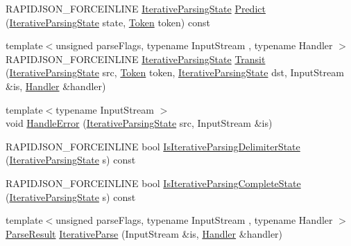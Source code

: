 \begin{DoxyCompactItemize}
\item 
R\+A\+P\+I\+D\+J\+S\+O\+N\+\_\+\+F\+O\+R\+C\+E\+I\+N\+L\+I\+NE \mbox{\hyperlink{classrapidjson_1_1_generic_reader_a1fd8fb2f2f017d42c89a5e11cd074e1e}{Iterative\+Parsing\+State}} \mbox{\hyperlink{classrapidjson_1_1_generic_reader_a83f1f41277978fa24483a53145b11bdd}{Predict}} (\mbox{\hyperlink{classrapidjson_1_1_generic_reader_a1fd8fb2f2f017d42c89a5e11cd074e1e}{Iterative\+Parsing\+State}} state, \mbox{\hyperlink{classrapidjson_1_1_generic_reader_a3fc870df419c60425cea2a15d36790d1}{Token}} token) const
\item 
{\footnotesize template$<$unsigned parse\+Flags, typename Input\+Stream , typename Handler $>$ }\\R\+A\+P\+I\+D\+J\+S\+O\+N\+\_\+\+F\+O\+R\+C\+E\+I\+N\+L\+I\+NE \mbox{\hyperlink{classrapidjson_1_1_generic_reader_a1fd8fb2f2f017d42c89a5e11cd074e1e}{Iterative\+Parsing\+State}} \mbox{\hyperlink{classrapidjson_1_1_generic_reader_af05af45f9228b7e306a02f8010eeaa46}{Transit}} (\mbox{\hyperlink{classrapidjson_1_1_generic_reader_a1fd8fb2f2f017d42c89a5e11cd074e1e}{Iterative\+Parsing\+State}} src, \mbox{\hyperlink{classrapidjson_1_1_generic_reader_a3fc870df419c60425cea2a15d36790d1}{Token}} token, \mbox{\hyperlink{classrapidjson_1_1_generic_reader_a1fd8fb2f2f017d42c89a5e11cd074e1e}{Iterative\+Parsing\+State}} dst, Input\+Stream \&is, \mbox{\hyperlink{classrapidjson_1_1_handler}{Handler}} \&handler)
\item 
{\footnotesize template$<$typename Input\+Stream $>$ }\\void \mbox{\hyperlink{classrapidjson_1_1_generic_reader_a5be3daf2d1424c4cfb6bc6016f1631fa}{Handle\+Error}} (\mbox{\hyperlink{classrapidjson_1_1_generic_reader_a1fd8fb2f2f017d42c89a5e11cd074e1e}{Iterative\+Parsing\+State}} src, Input\+Stream \&is)
\item 
R\+A\+P\+I\+D\+J\+S\+O\+N\+\_\+\+F\+O\+R\+C\+E\+I\+N\+L\+I\+NE bool \mbox{\hyperlink{classrapidjson_1_1_generic_reader_a2c81d094fdfb956b0df3802c90803b52}{Is\+Iterative\+Parsing\+Delimiter\+State}} (\mbox{\hyperlink{classrapidjson_1_1_generic_reader_a1fd8fb2f2f017d42c89a5e11cd074e1e}{Iterative\+Parsing\+State}} s) const
\item 
R\+A\+P\+I\+D\+J\+S\+O\+N\+\_\+\+F\+O\+R\+C\+E\+I\+N\+L\+I\+NE bool \mbox{\hyperlink{classrapidjson_1_1_generic_reader_aaf633f07e16c025f3784542fb40c5470}{Is\+Iterative\+Parsing\+Complete\+State}} (\mbox{\hyperlink{classrapidjson_1_1_generic_reader_a1fd8fb2f2f017d42c89a5e11cd074e1e}{Iterative\+Parsing\+State}} s) const
\item 
{\footnotesize template$<$unsigned parse\+Flags, typename Input\+Stream , typename Handler $>$ }\\\mbox{\hyperlink{structrapidjson_1_1_parse_result}{Parse\+Result}} \mbox{\hyperlink{classrapidjson_1_1_generic_reader_ad133a9a441857a1beaac20802b83abe5}{Iterative\+Parse}} (Input\+Stream \&is, \mbox{\hyperlink{classrapidjson_1_1_handler}{Handler}} \&handler)
\end{DoxyCompactItemize}
